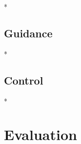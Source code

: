 \documentclass[conference]{IEEEtran}
\begin{document}
%
%
%    
%    
%
%    
%    
%    
%          
%
%
%
%
%
%
% 
%
%
%

*

\subsection{Guidance}
\label{sec:Guidance}
*


\subsection{Control}
\label{Control}
*


\section{Evaluation}
\label{sec:experimental}
\end{document}

